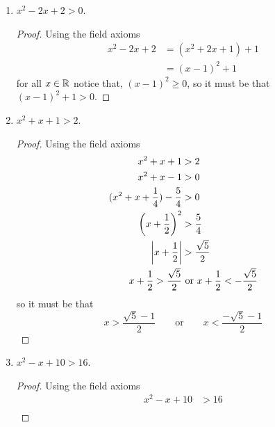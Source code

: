 \begin{exercise}[\textbf{4}]
\begin{enumerate}
\begin{proof}
         Hence, 
         \begin{equation*}
             x-3>0 \qquad \text{and} \qquad x-1>0
         \end{equation*}
         so it must be that $x>3$. Or 
         \begin{equation*}
             x-3<0 \qquad \text{and} \qquad x-1>0
         \end{equation*}
         and it must be that $x<1$. That is $(x-3)(x-1) > 0$ if $x>3$ or $x<1$.
         \end{proof}
         \pagebreak
         \item $x^2-2x+2 > 0$.
         \begin{proof} Using the field axioms
              \begin{align*}
                  x^2-2x+2 &= (x^2+2x+1)+1 \\
                  &= (x-1)^2+1
              \end{align*}
              for all $x\in \mathbb{R}$ notice that, $(x-1)^2 \geq 0$, so it must be that
              $(x-1)^2+1>0$.
         \end{proof}
         \item $x^2+x+1 > 2$.
         \begin{proof} Using the field axioms
              \begin{align*}
                  x^2+x+1 &> 2 \\
                  x^2+x-1 &> 0 \\
                  (x^2+x+\frac{1}{4})-\frac{5}{4} &> 0 \\
                  \left(x+\frac{1}{2}\right)^2 &> \frac{5}{4} \\
                  \left\lvert x+\frac{1}{2}\right\rvert &> \frac{\sqrt{5}}{2} \\
                  x+\frac{1}{2} > \frac{\sqrt{5}}{2} &\text{ or } x+\frac{1}{2}< -\frac{\sqrt{5}}{2}
              \end{align*}
              so it must be that
              \begin{equation*}
                  x > \frac{\sqrt5-1}{2} \qquad \text{or} \qquad x < \frac{-\sqrt{5}-1}{2}
              \end{equation*}
         \end{proof}
         \item $x^2-x+10 > 16$.
         \begin{proof} Using the field axioms
            \begin{align*}
                x^2-x+10 &>16 \\

\end{align*}
\end{proof}
\end{enumerate}
\end{exercise}
